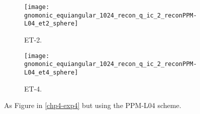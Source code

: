 \begin{figure}[!htb]
	\centering
	\begin{subfigure}{0.49\textwidth}
		\centering
		\texttt{[image: gnomonic\_equiangular\_1024\_recon\_q\_ic\_2\_reconPPM-L04\_et2\_sphere]}
		\caption{ET-2.\label{chp4-exp5-a}}
	\end{subfigure}
	\begin{subfigure}{0.49\textwidth}
		\centering
		\texttt{[image: gnomonic\_equiangular\_1024\_recon\_q\_ic\_2\_reconPPM-L04\_et4\_sphere]}
		\caption{ET-4.\label{chp4-exp5-b}}
	\end{subfigure}
	\caption{As Figure in \ref{chp4-exp4} but using the PPM-L04 scheme.\label{chp4-exp5}}
\end{figure}